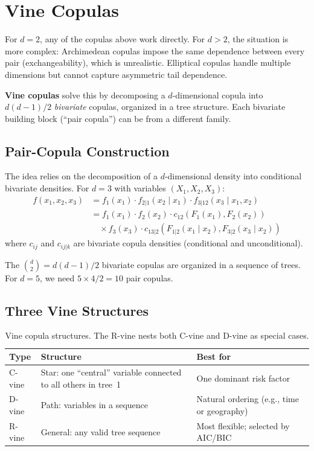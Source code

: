 \documentclass[11pt, a4paper]{article}
\theoremstyle{definition}
\theoremstyle{plain}
\theoremstyle{remark}
\begin{document}
\section{Vine Copulas}
\label{sec:vine}

For $d = 2$, any of the copulas above work directly.
For $d > 2$, the situation is more complex:
Archimedean copulas impose the same dependence between every pair (exchangeability),
which is unrealistic.
Elliptical copulas handle multiple dimensions but cannot capture asymmetric tail dependence.

\textbf{Vine copulas} solve this by decomposing a $d$-dimensional copula
into $d(d-1)/2$ \emph{bivariate} copulas, organized in a tree structure.
Each bivariate building block (``pair copula'') can be from a different family.

\subsection{Pair-Copula Construction}

The idea relies on the decomposition of a $d$-dimensional density into conditional bivariate densities.
For $d = 3$ with variables $(X_1, X_2, X_3)$:
\begin{align*}
    f(x_1, x_2, x_3)
    &= f_1(x_1) \cdot f_{2|1}(x_2 \mid x_1) \cdot f_{3|12}(x_3 \mid x_1, x_2) \\
    &= f_1(x_1) \cdot f_2(x_2) \cdot c_{12}(F_1(x_1), F_2(x_2)) \\
    &\quad \times f_3(x_3) \cdot c_{13|2}(F_{1|2}(x_1 \mid x_2), F_{3|2}(x_3 \mid x_2))
\end{align*}
where $c_{ij}$ and $c_{ij|k}$ are bivariate copula densities (conditional and unconditional).

The $\binom{d}{2} = d(d-1)/2$ bivariate copulas are organized in a sequence of trees.
For $d = 5$, we need $5 \times 4 / 2 = 10$ pair copulas.

\subsection{Three Vine Structures}

\begin{table}[H]
\centering
\begin{tabular}{@{}lp{6.5cm}l@{}}
\toprule
\textbf{Type} & \textbf{Structure} & \textbf{Best for} \\
\midrule
C-vine & Star: one ``central'' variable connected to all others in tree~1 & One dominant risk factor \\
D-vine & Path: variables in a sequence & Natural ordering (e.g., time or geography) \\
R-vine & General: any valid tree sequence & Most flexible; selected by AIC/BIC \\
\bottomrule
\end{tabular}
\caption{Vine copula structures. The R-vine nests both C-vine and D-vine as special cases.}
\end{table}
\end{document}
